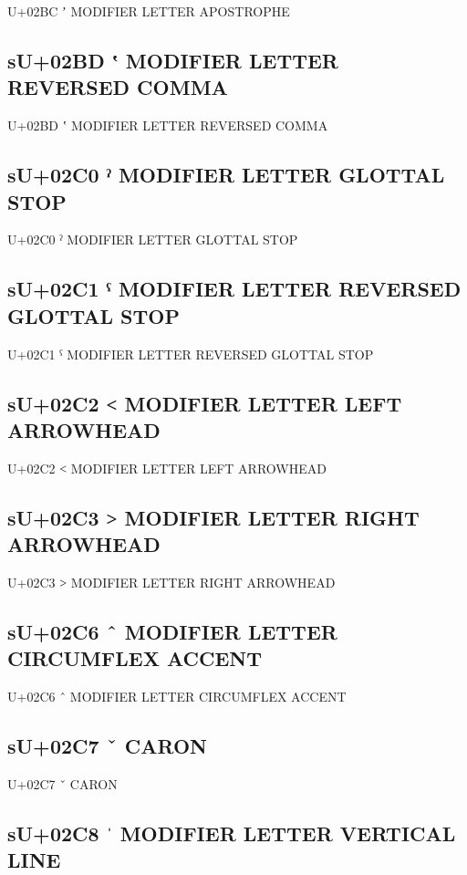 U+02BC ʼ MODIFIER LETTER APOSTROPHE

\subsection{sU+02BD ʽ MODIFIER LETTER REVERSED COMMA}

U+02BD ʽ MODIFIER LETTER REVERSED COMMA

\subsection{sU+02C0 ˀ MODIFIER LETTER GLOTTAL STOP}

U+02C0 ˀ MODIFIER LETTER GLOTTAL STOP

\subsection{sU+02C1 ˁ MODIFIER LETTER REVERSED GLOTTAL STOP}

U+02C1 ˁ MODIFIER LETTER REVERSED GLOTTAL STOP

\subsection{sU+02C2 ˂ MODIFIER LETTER LEFT ARROWHEAD}

U+02C2 ˂ MODIFIER LETTER LEFT ARROWHEAD

\subsection{sU+02C3 ˃ MODIFIER LETTER RIGHT ARROWHEAD}

U+02C3 ˃ MODIFIER LETTER RIGHT ARROWHEAD

\subsection{sU+02C6 ˆ  MODIFIER LETTER CIRCUMFLEX ACCENT}

U+02C6 ˆ  MODIFIER LETTER CIRCUMFLEX ACCENT

\subsection{sU+02C7 ˇ  CARON}

U+02C7 ˇ  CARON

\subsection{sU+02C8 ˈ MODIFIER LETTER VERTICAL LINE}

